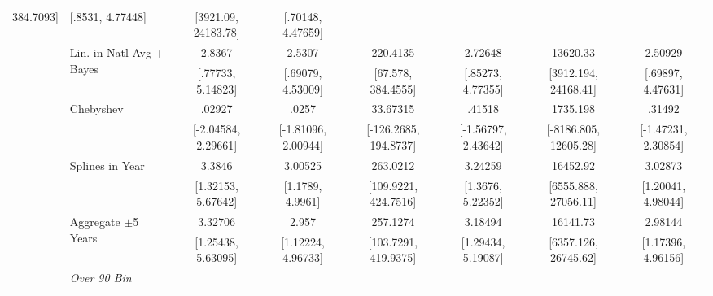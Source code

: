 \begin{landscape}
\begin{table}[htb]
\begin{threeparttable}
{\begin{tabular}{llcccccc}
384.7093] & [.8531, 4.77448] & [3921.09, 24183.78] & [.70148, 4.47659] \\ & \multirow{2}{*}{Lin. in Natl Avg + Bayes} & 2.8367 & 2.5307 & 220.4135 & 2.72648 & 13620.33 & 2.50929 \\  & & [.77733, 5.14823] & [.69079, 4.53009] & [67.578, 384.4555] & [.85273, 4.77355] & [3912.194, 24168.41] & [.69897, 4.47631] \\ & \multirow{2}{*}{Chebyshev} & .02927 & .0257 & 33.67315 & .41518 & 1735.198 & .31492 \\  & & [-2.04584, 2.29661] & [-1.81096, 2.00944] & [-126.2685, 194.8737] & [-1.56797, 2.43642] & [-8186.805, 12605.28] & [-1.47231, 2.30854] \\ & \multirow{2}{*}{Splines in Year} & 3.3846 & 3.00525 & 263.0212 & 3.24259 & 16452.92 & 3.02873 \\  & & [1.32153, 5.67642] & [1.1789, 4.9961] & [109.9221, 424.7516] & [1.3676, 5.22352] & [6555.888, 27056.11] & [1.20041, 4.98044] \\ & \multirow{2}{*}{Aggregate \(\pm\)5 Years} & 3.32706 & 2.957 & 257.1274 & 3.18494 & 16141.73 & 2.98144 \\  & & [1.25438, 5.63095] & [1.12224, 4.96733] & [103.7291, 419.9375] & [1.29434, 5.19087] & [6357.126, 26745.62] & [1.17396, 4.96156] \\
\cmidrule(lr){2-8}  & \textit{Over 90 Bin} \\

\end{tabular}}
\end{threeparttable}
\end{table}
\end{landscape}
